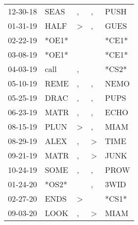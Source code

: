 \begin{supertabular}{lllll}
 12-30-18 &   SEAS &                , &                , &   PUSH \\
 01-31-19 &   HALF &     \textgreater &                , &   GUES \\
 02-22-19 &  *OE1* &                  &                  &  *CE1* \\
 03-08-19 &  *OE1* &                  &                  &  *CE1* \\
 04-03-19 &   call &                , &                  &  *CS2* \\
 05-10-19 &   REME &                , &                , &   NEMO \\
 05-25-19 &   DRAC &                , &                , &   PUPS \\
 06-23-19 &   MATR &                , &                , &   ECHO \\
 08-15-19 &   PLUN &     \textgreater &                , &   MIAM \\
 08-29-19 &   ALEX &                , &     \textgreater &   TIME \\
 09-21-19 &   MATR &                , &     \textgreater &   JUNK \\
 10-24-19 &   SOME &                , &                , &   PROW \\
 01-24-20 &  *OS2* &                  &                , &   3WID \\
 02-27-20 &   ENDS &     \textgreater &                  &  *CS1* \\
 09-03-20 &   LOOK &                , &     \textgreater &   MIAM \\
\end{supertabular}
